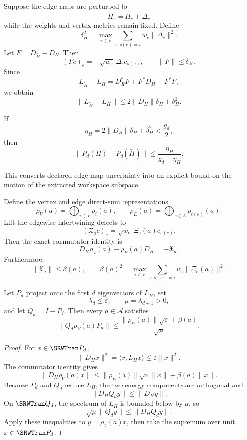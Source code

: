 
Suppose the edge maps are perturbed to
\[
\widetilde H_e=H_e+\Delta_e
\]
while the weights and vertex metrics remain fixed. Define
\[
\boxed{
\delta_H^2
=
\max_{i\in V}
\sum_{e:s(e)=i}w_e\|\Delta_e\|^2.
}
\]
Let \(F=D_{\widetilde H}-D_H\). Then
\[
(Fc)_e=-\sqrt{w_e}\,\Delta_ec_{s(e)},
\qquad
\|F\|\leq\delta_H.
\]
Since
\[
L_{\widetilde H}-L_H
=D_H^*F+F^*D_H+F^*F,
\]
we obtain
\[
\boxed{
\|L_{\widetilde H}-L_H\|
\leq
2\|D_H\|\delta_H+\delta_H^2.
}
\]

\begin{SRWTcorollary}\label{SRWT:cor:edge-stability}
If
\[
\eta_H=2\|D_H\|\delta_H+\delta_H^2
<\frac{g_d}{2},
\]
then
\[
\boxed{
\|P_d(H)-P_d(\widetilde H)\|
\leq
\frac{\eta_H}{g_d-\eta_H}.
}
\]
\end{SRWTcorollary}

This converts declared edge-map uncertainty into an explicit bound on the
motion of the extracted workspace subspace.


Define the vertex and edge direct-sum representations
\[
\rho_V(a)=\bigoplus_{i\in V}\rho_i(a),
\qquad
\rho_E(a)=\bigoplus_{e\in E}\rho_{t(e)}(a).
\]
Lift the edgewise intertwining defects to
\[
(\mathfrak X_a c)_e
=
\sqrt{w_e}\,\Xi_e(a)c_{s(e)}.
\]
Then the exact commutator identity is
\[
\boxed{
D_H\rho_V(a)-\rho_E(a)D_H=-\mathfrak X_a.
}
\]
Furthermore,
\[
\|\mathfrak X_a\|
\leq
\beta(a),
\qquad
\beta(a)^2
=
\max_{i\in V}
\sum_{e:s(e)=i}w_e\|\Xi_e(a)\|^2.
\]

\begin{SRWTtheorem}\label{SRWT:thm:approx-operation-closure}
Let \(P_d\) project onto the first \(d\) eigenvectors of \(L_H\), set
\[
\lambda_d\leq\varepsilon,
\qquad
\mu=\lambda_{d+1}>0,
\]
and let \(Q_d=I-P_d\). Then every \(a\in\mathcal A\) satisfies
\[
\boxed{
\|Q_d\rho_V(a)P_d\|
\leq
\frac{
\|\rho_E(a)\|\sqrt{\varepsilon}+\beta(a)
}{\sqrt{\mu}}.
}
\]
\end{SRWTtheorem}

\begin{proof}
For \(x\in\SRWTran P_d\),
\[
\|D_Hx\|^2
=\langle x,L_Hx\rangle
\leq\varepsilon\|x\|^2.
\]
The commutator identity gives
\[
\|D_H\rho_V(a)x\|
\leq
\|\rho_E(a)\|\sqrt{\varepsilon}\|x\|
+
\beta(a)\|x\|.
\]
Because \(P_d\) and \(Q_d\) reduce \(L_H\), the two energy components are
orthogonal and
\[
\|D_HQ_dy\|\leq\|D_Hy\|.
\]
On \(\SRWTran Q_d\), the spectrum of \(L_H\) is bounded below by \(\mu\), so
\[
\sqrt{\mu}\|Q_dy\|
\leq
\|D_HQ_dy\|.
\]
Apply these inequalities to \(y=\rho_V(a)x\), then take the supremum over unit
\(x\in\SRWTran P_d\).
\end{proof}


